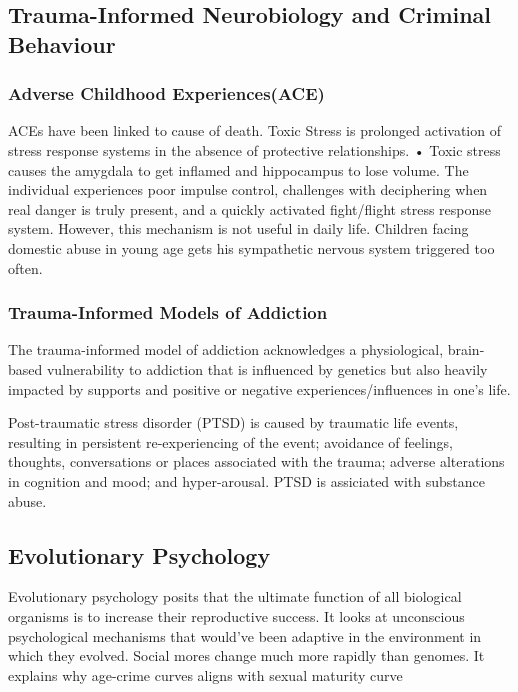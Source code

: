 \documentclass[11pt]{article}
\begin{document}
\subsection{Trauma-Informed Neurobiology and Criminal Behaviour}
\subsubsection*{Adverse Childhood Experiences(ACE)}

ACEs have been linked to cause of death. Toxic Stress is prolonged activation of stress response systems in the absence of protective relationships. 	• Toxic stress causes the amygdala to get inflamed and hippocampus to lose volume. The individual experiences poor impulse control, challenges with deciphering when real danger is truly present, and a quickly activated fight/flight stress response system. However, this mechanism is not useful in daily life. Children facing domestic abuse in young age gets his sympathetic nervous system triggered too often.

\subsubsection*{Trauma-Informed Models of Addiction}

The trauma-informed model of addiction acknowledges a physiological, brain-based vulnerability to addiction that is influenced by genetics but also heavily impacted by supports and positive or negative experiences/influences in one’s life.

Post-traumatic stress disorder (PTSD) is caused by traumatic life events, resulting in persistent re-experiencing of the event; avoidance of feelings, thoughts, conversations or places associated with the trauma; adverse alterations in cognition and mood; and hyper-arousal. PTSD is assiciated with substance abuse.

\subsection{Evolutionary Psychology}

Evolutionary psychology posits that the ultimate function of all biological organisms is to increase their reproductive success. It looks at unconscious psychological mechanisms that would've been adaptive in the environment in which they evolved. Social mores change much more rapidly than genomes. It explains why age-crime curves aligns with sexual maturity curve
\end{document}
